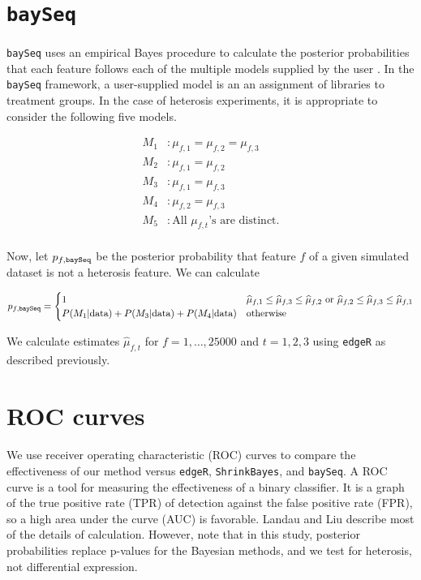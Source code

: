 \documentclass{article}
\providecommand{\wh}[1]{\widehat{#1}}
\begin{document}
\begin{flushleft}
\section{{\tt baySeq}}

\paragraph{} {\tt baySeq} uses an empirical Bayes procedure to calculate the posterior probabilities that each feature follows each of the multiple models supplied by the user \cite{baySeq}. In the {\tt baySeq} framework, a user-supplied model is an an assignment of libraries to treatment groups. In the case of heterosis experiments, it is appropriate to consider the following five models.

\begin{align*}
M_1&: \mu_{f, 1} = \mu_{f, 2} = \mu_{f, 3} \\
M_2&: \mu_{f, 1} = \mu_{f, 2} \\
M_3&: \mu_{f, 1} = \mu_{f, 3} \\
M_4&: \mu_{f, 2} = \mu_{f, 3} \\
M_5&: \text{All } \mu_{f, t}\text{'s are distinct.} \\
\end{align*}

Now, let $p_{f, {\tt baySeq}}$ be the posterior probability that feature $f$ of a given simulated dataset is not a heterosis feature. We can calculate

\begin{align*}
p_{f, {\tt baySeq}} = \begin{cases}
1 & \wh{\mu}_{f, 1} \le \wh{\mu}_{f, 3} \le \wh{\mu}_{f, 2} \text{ or } \wh{\mu}_{f, 2} \le \wh{\mu}_{f, 3} \le \wh{\mu}_{f, 1} \\
P(M_1 | \text{data}) + P(M_3 | \text{data}) + P(M_4 | \text{data}) & \text{otherwise}
\end{cases}
\end{align*}

We calculate estimates $\wh{\mu}_{f, t}$ for $f = 1, \ldots, 25000$ and $t = 1, 2, 3$ using {\tt edgeR} as described previously.

\section{ROC curves}

\paragraph{} We use receiver operating characteristic (ROC) curves to compare the effectiveness of our method versus {\tt edgeR}, {\tt ShrinkBayes}, and {\tt baySeq}. A ROC curve is a tool for measuring the effectiveness of a binary classifier. It is a graph of the true positive rate (TPR) of detection against the false positive rate (FPR), so a high area under the curve (AUC) is favorable. Landau and Liu \cite{LandauLiu} describe most of the details of calculation. However, note that in this study, posterior probabilities replace p-values for the Bayesian methods, and we test for heterosis, not differential expression.


\end{flushleft}
\end{document}
